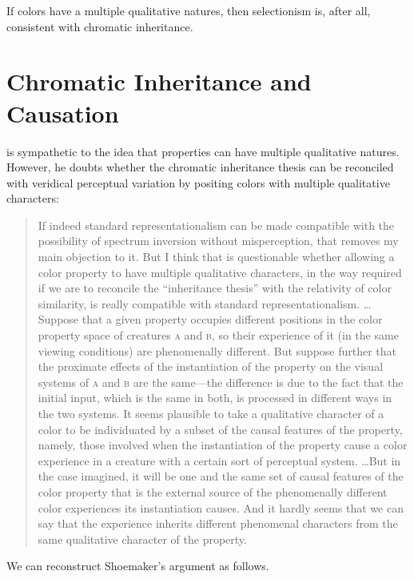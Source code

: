 \documentclass[12pt]{article}
\begin{document}
If colors have a multiple qualitative natures, then selectionism is, after all, consistent with chromatic inheritance.


\section{Chromatic Inheritance and Causation}\label{sec:inhertance_and_chromatic_causation}

\citet{Shoemaker:2006vn} is sympathetic to the idea that properties can have multiple qualitative natures. However, he doubts whether the chromatic inheritance thesis can be reconciled with veridical perceptual variation by positing colors with multiple qualitative characters: 
\begin{quote}
	If indeed standard representationalism can be made compatible with the possibility of spectrum inversion without misperception, that removes my main objection to it. But I think that is questionable whether allowing a color property to have multiple qualitative characters, in the way required if we are to reconcile the ``inheritance thesis'' with the relativity of color similarity, is really compatible with standard representationalism. \ldots Suppose that a given property occupies different positions in the color property space of creatures \textsc{a} and \textsc{b}, so their experience of it (in the same viewing conditions) are phenomenally different. But suppose further that the proximate effects of the instantiation of the property on the visual systems of \textsc{a} and \textsc{b} are the same---the difference is due to the fact that the initial input, which is the same in both, is processed in different ways in the two systems. It seems plausible to take a qualitative character of a color to be individuated by a subset of the causal features of the property, namely, those involved when the instantiation of the property cause a color experience in a creature with a certain sort of perceptual system. \ldots But in the case imagined, it will be one and the same set of causal features of the color property that is the external source of the phenomenally different color experiences its instantiation causes. And it hardly seems that we can say that the experience inherits different phenomenal characters from the same qualitative character of the property. \citep[p.\ 269]{Shoemaker:wk} 
\end{quote}

We can reconstruct Shoemaker's argument as follows.
\end{document}
